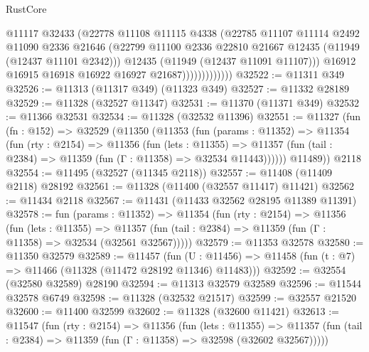 \begin{lexlean}{RustCore}
\begin{coremodule}
                            @11117
                            @32433
                            (@22778
                              @11108
                              @11115
                              @4338
                              (@22785
                                @11107
                                @11114
                                @2492
                                @11090
                                @2336
                                @21646
                                (@22799
                                  @11100
                                  @2336
                                  @22810
                                  @21667
                                  @12435
                                  (@11949 (@12437 @11101 @2342)))
                                @12435
                                (@11949 (@12437 @11091 @11107)))
                              @16912
                              @16915
                              @16918
                              @16922
                              @16927
                              @21687)))))))))))))
@32522 := @11311 @349
@32526 := @11313 (@11317 @349) (@11323 @349)
@32527 := @11332 @28189
@32529 := @11328 (@32527 @11347)
@32531 := @11370 (@11371 @349)
@32532 := @11366 @32531
@32534 := @11328 (@32532 @11396)
@32551 := @11327
    (fun (fn : @152) =>
    @32529
      (@11350
        (@11353
          (fun (params : @11352) =>
          @11354
            (fun (rty : @2154) =>
            @11356
              (fun (lets : @11355) =>
              @11357 (fun (tail : @2384) => @11359 (fun (Γ : @11358) => @32534 @11443))))))
        @11489))
    @2118
@32554 := @11495 (@32527 (@11345 @2118))
@32557 := @11408 (@11409 @2118) @28192
@32561 := @11328 (@11400 (@32557 @11417) @11421)
@32562 := @11434 @2118
@32567 := @11431 (@11433 @32562 @28195 @11389 @11391)
@32578 := fun (params : @11352) =>
  @11354
    (fun (rty : @2154) =>
    @11356
      (fun (lets : @11355) =>
      @11357 (fun (tail : @2384) => @11359 (fun (Γ : @11358) => @32534 (@32561 @32567)))))
@32579 := @11353 @32578
@32580 := @11350 @32579
@32589 := @11457
    (fun (U : @11456) => @11458 (fun (t : @7) => @11466 (@11328 (@11472 @28192 @11346) @11483)))
@32592 := @32554 (@32580 @32589) @28190
@32594 := @11313 @32579 @32589
@32596 := @11544 @32578 @6749
@32598 := @11328 (@32532 @21517)
@32599 := @32557 @21520
@32600 := @11400 @32599
@32602 := @11328 (@32600 @11421)
@32613 := @11547
    (fun (rty : @2154) =>
    @11356
      (fun (lets : @11355) =>
      @11357 (fun (tail : @2384) => @11359 (fun (Γ : @11358) => @32598 (@32602 @32567)))))

\end{coremodule}
\end{lexlean}
